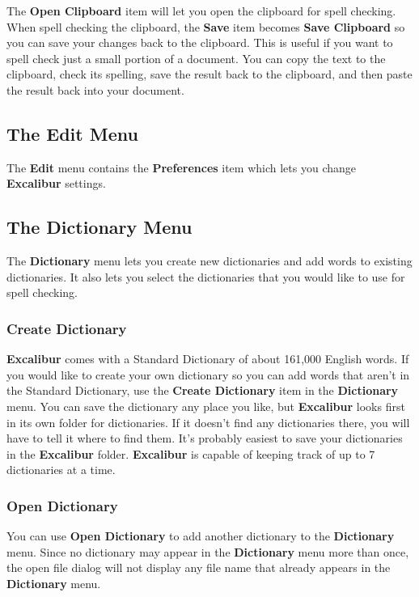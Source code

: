 ﻿\documentclass[11pt,titlepage]{article}
\newcommand{\ex}{\textbf{Excalibur}}
\begin{document}
The \textbf{Open Clipboard} item will let you open the clipboard for
spell checking.  When spell checking the clipboard, the \textbf{Save}
item becomes \textbf{Save Clipboard} so you can save your changes back
to the clipboard.  This is useful if you want to spell check just a
small portion of a document.  You can copy the text to the clipboard,
check its spelling, save the result back to the clipboard, and then
paste the result back into your document.

\subsection{The Edit Menu}

The \textbf{Edit} menu contains the \textbf{Preferences} item which
lets you change \ex{} settings.

\subsection{The Dictionary Menu}

The \textbf{Dictionary} menu lets you create new dictionaries and add
words to existing dictionaries. It also lets you select the
dictionaries that you would like to use for spell checking.

\subsubsection{Create Dictionary}

\ex{} comes with a Standard Dictionary of about 161,000 English words.
If you would like to create your own dictionary so you can add words
that aren't in the Standard Dictionary, use the \textbf{Create
  Dictionary} item in the \textbf{Dictionary} menu. You can save the
dictionary any place you like, but \ex{} looks first in its own folder
for dictionaries. If it doesn't find any dictionaries there, you will
have to tell it where to find them. It's probably easiest to save your
dictionaries in the \ex{} folder.  \ex{} is capable of keeping track
of up to 7 dictionaries at a time.

\subsubsection{Open Dictionary}

You can use \textbf{Open Dictionary} to add another dictionary to the
\textbf{Dictionary} menu.  Since no dictionary may appear in the
\textbf{Dictionary} menu more than once, the open file dialog will not
display any file name that already appears in the \textbf{Dictionary}
menu.
\end{document}
